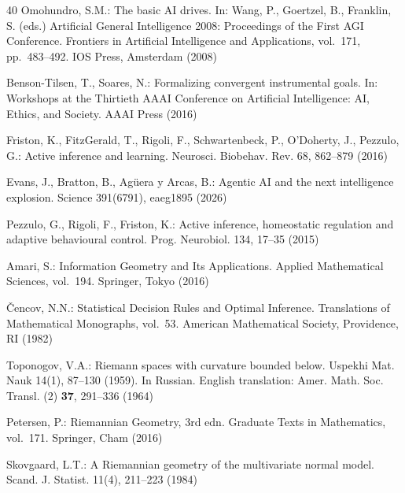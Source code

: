 \documentclass[runningheads]{llncs}
\begin{document}
\begin{thebibliography}{40}
Omohundro, S.M.: The basic AI drives. In: Wang, P., Goertzel, B., Franklin, S. (eds.) Artificial General Intelligence 2008: Proceedings of the First AGI Conference. Frontiers in Artificial Intelligence and Applications, vol.~171, pp.~483--492. IOS Press, Amsterdam (2008)

Benson-Tilsen, T., Soares, N.: Formalizing convergent instrumental goals. In: Workshops at the Thirtieth AAAI Conference on Artificial Intelligence: AI, Ethics, and Society. AAAI Press (2016)

Friston, K., FitzGerald, T., Rigoli, F., Schwartenbeck, P., O'Doherty, J., Pezzulo, G.: Active inference and learning. Neurosci. Biobehav. Rev. 68, 862--879 (2016)

Evans, J., Bratton, B., Ag\"uera y Arcas, B.: Agentic AI and the next intelligence explosion. Science 391(6791), eaeg1895 (2026)

Pezzulo, G., Rigoli, F., Friston, K.: Active inference, homeostatic regulation and adaptive behavioural control. Prog. Neurobiol. 134, 17--35 (2015)

Amari, S.: Information Geometry and Its Applications. Applied Mathematical Sciences, vol.~194. Springer, Tokyo (2016)

{\v C}encov, N.N.: Statistical Decision Rules and Optimal Inference. Translations of Mathematical Monographs, vol.~53. American Mathematical Society, Providence, RI (1982)

Toponogov, V.A.: Riemann spaces with curvature bounded below. Uspekhi Mat. Nauk 14(1), 87--130 (1959). In Russian. English translation: Amer. Math. Soc. Transl. (2) \textbf{37}, 291--336 (1964)

Petersen, P.: Riemannian Geometry, 3rd edn. Graduate Texts in Mathematics, vol.~171. Springer, Cham (2016)

Skovgaard, L.T.: A Riemannian geometry of the multivariate normal model. Scand. J. Statist. 11(4), 211--223 (1984)

\end{thebibliography}
\end{document}
